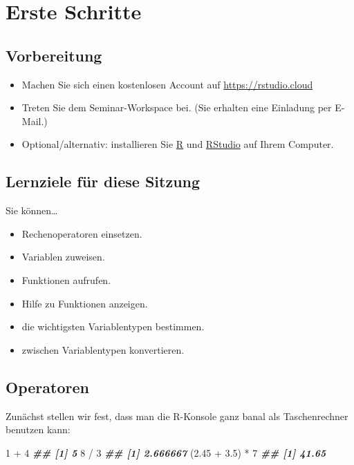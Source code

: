 \documentclass[
  ngerman,
]{article}
\newenvironment{Shaded}{\begin{snugshade}}{\end{snugshade}}
\newcommand{\DecValTok}[1]{\textcolor[rgb]{0.00,0.00,0.81}{#1}}
\newcommand{\DocumentationTok}[1]{\textcolor[rgb]{0.56,0.35,0.01}{\textbf{\textit{#1}}}}
\newcommand{\FloatTok}[1]{\textcolor[rgb]{0.00,0.00,0.81}{#1}}
\newcommand{\NormalTok}[1]{#1}
\newcommand{\SpecialCharTok}[1]{\textcolor[rgb]{0.00,0.00,0.00}{#1}}
\providecommand{\tightlist}{%
  \setlength{\itemsep}{0pt}\setlength{\parskip}{0pt}}
\begin{document}
\hypertarget{erste-schritte}{%
\section{Erste Schritte}\label{erste-schritte}}

\hypertarget{vorbereitung}{%
\subsection{Vorbereitung}\label{vorbereitung}}

\begin{itemize}
\tightlist
\item
  Machen Sie sich einen kostenlosen Account auf \url{https://rstudio.cloud}
\item
  Treten Sie dem Seminar-Workspace bei. (Sie erhalten eine Einladung per E-Mail.)
\item
  Optional/alternativ: installieren Sie \href{https://www.r-project.org/}{R} und \href{https://rstudio.com/}{RStudio} auf Ihrem Computer.
\end{itemize}

\hypertarget{lernziele-fuxfcr-diese-sitzung}{%
\subsection{Lernziele für diese Sitzung}\label{lernziele-fuxfcr-diese-sitzung}}

Sie können\ldots{}

\begin{itemize}
\tightlist
\item
  Rechenoperatoren einsetzen.
\item
  Variablen zuweisen.
\item
  Funktionen aufrufen.
\item
  Hilfe zu Funktionen anzeigen.
\item
  die wichtigsten Variablentypen bestimmen.
\item
  zwischen Variablentypen konvertieren.
\end{itemize}

\hypertarget{operatoren}{%
\subsection{Operatoren}\label{operatoren}}

Zunächst stellen wir fest, dass man die R-Konsole ganz banal als Taschenrechner benutzen kann:

\begin{Shaded}
\begin{Highlighting}[]
\DecValTok{1} \SpecialCharTok{+} \DecValTok{4}
\DocumentationTok{\#\# [1] 5}
\DecValTok{8} \SpecialCharTok{/} \DecValTok{3}
\DocumentationTok{\#\# [1] 2.666667}
\NormalTok{(}\FloatTok{2.45} \SpecialCharTok{+} \FloatTok{3.5}\NormalTok{) }\SpecialCharTok{*} \DecValTok{7}
\DocumentationTok{\#\# [1] 41.65}
\end{Highlighting}
\end{Shaded}
\end{document}
